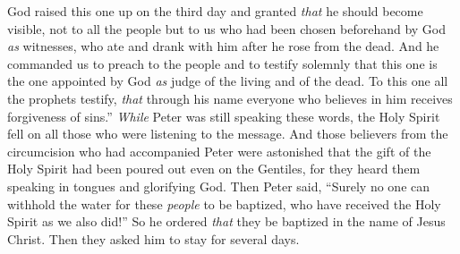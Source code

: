 \begin{biblechapter}
\verse God raised this one up on the third day and granted \textit{that} he should become visible,
\verse not to all the people but to us who had been chosen beforehand by God \textit{as} witnesses, who ate and drank with him after he rose from the dead.
\verse And he commanded us to preach to the people and to testify solemnly that this one is the one appointed by God \textit{as} judge of the living and of the dead.
\verse To this one all the prophets testify, \textit{that} through his name everyone who believes in him receives forgiveness of sins.”
 \textit{While} Peter was still speaking these words, the Holy Spirit fell on all those who were listening to the message.
\verse And those believers from the circumcision who had accompanied Peter were astonished that the gift of the Holy Spirit had been poured out even on the Gentiles,
\verse for they heard them speaking in tongues and glorifying God. Then Peter said,
\verse “Surely no one can withhold the water for these \textit{people} to be baptized, who have received the Holy Spirit as we also did!”
\verse So he ordered \textit{that} they be baptized in the name of Jesus Christ. Then they asked him to stay for several days.
\end{biblechapter}

